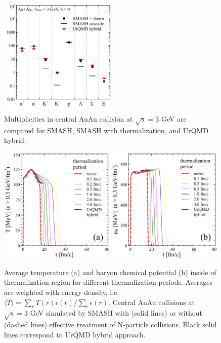 \begin{figure}
  \centering
  \includegraphics[width=0.5\textwidth]{plots/forced_thermalization/urqmd_smash_compar.pdf}
  \caption{Multiplicities in central AuAu collision at $\sqrt{s} = 3$ GeV
           are compared for SMASH, SMASH with thermalization, and UrQMD hybrid.}
  \label{Fig:AuAu_smash_urqmd}
\end{figure}

\begin{figure}
  \centering
  \includegraphics[width=0.49\textwidth]{plots/forced_thermalization/Tav_dt.pdf}
  \includegraphics[width=0.49\textwidth]{plots/forced_thermalization/mubav_dt.pdf}
  \caption{Average temperature (a) and baryon chemical potential (b) inside of
           thermalization region for different thermalization periods. Averages are
           weighted with energy density, i.e. $\langle T \rangle = \sum_r T(r) \epsilon(r)
           / \sum_r \epsilon(r)$. Central AuAu collisions at $\sqrt{s} = 3$ GeV simulated
           by SMASH with (solid lines) or without (dashed lines) effective treatment of
           N-particle collisions. Black solid lines correspond to UrQMD hybrid approach.}
  \label{Fig:AuAu_Tmu}
\end{figure}

